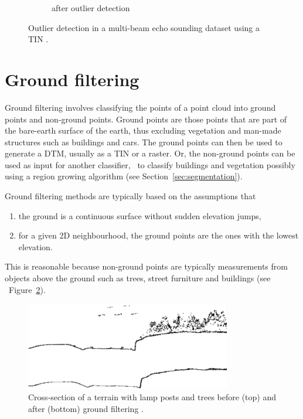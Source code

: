 \begin{figure}
\begin{subfigure}[b]{0.4\linewidth}
    \caption{after outlier detection}
  \end{subfigure}
\caption{Outlier detection in a multi-beam echo sounding dataset using a TIN \citep{Arge10}.}
\label{fig:mbes}
\end{figure}


%

\section{Ground filtering}
Ground filtering involves classifying the points of a point cloud into ground points and non-ground points.
Ground points are those points that are part of the bare-earth surface of the earth, thus excluding vegetation and man-made structures such as buildings and cars.
The ground points can then be used to generate a DTM, usually as a TIN or a raster.
Or, the non-ground points can be used as input for another classifier, \eg\ to classify buildings and vegetation possibly using a region growing algorithm (see Section~\ref{sec:segmentation}).

Ground filtering methods are typically based on the assumptions that 
\begin{enumerate}
  \item the ground is a continuous surface without sudden elevation jumps, 
  \item for a given 2D neighbourhood, the ground points are the ones with the lowest elevation.
\end{enumerate}
This is reasonable because non-ground points are typically measurements from objects above the ground such as trees, street furniture and buildings (see \eg\ Figure~\ref{fig:axelsson:profiles}).

\begin{figure}
  \centering
  \includegraphics[width=0.8\textwidth]{figs/axelsson-profiles.png}
  \caption{Cross-section of a terrain with lamp posts and trees before (top) and after (bottom) ground filtering \citep{axelsson2000generation}.}
\label{fig:axelsson:profiles}
\end{figure}

